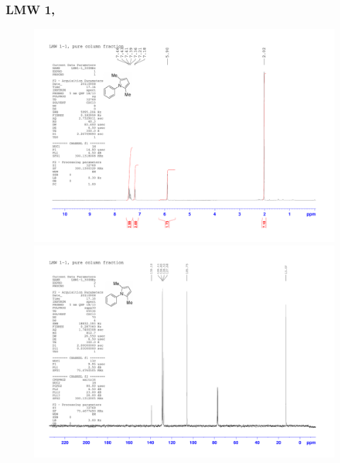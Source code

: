 \documentclass[12pt, a4paper,titlepage]{article}
\begin{document}
{\subsubsection*{LMW 1, \pageref{exp:LMW1}}
\label{spec:LMW1}
	\begin{figure}[H] 
	\begin{center}
	\includegraphics[width=14.5cm]{expdata/LMW1/1H}
	\includegraphics[width=14.5cm]{expdata/LMW1/13C}
	\end{center}
	\end{figure}

}
\end{document}
